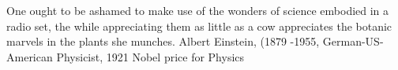 {One ought to be ashamed to make use of the wonders of science embodied in a radio set, the while appreciating them as little as a cow appreciates the botanic marvels in the plants she munches.}
{Albert Einstein, (1879 -1955, German-US-American Physicist, 1921 Nobel price for Physics}



%
\newpage



%
%


